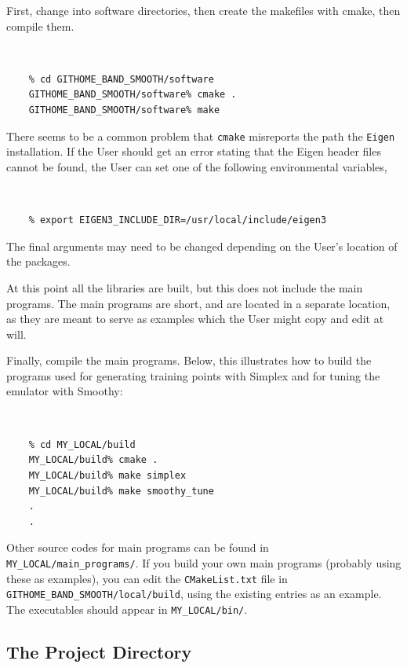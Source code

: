 \documentclass[UserManual.tex]{subfiles}
\begin{document}
First, change into software directories, then create the makefiles with cmake, then compile them.
{\tt 
\begin{verbatim}
    % cd GITHOME_BAND_SMOOTH/software
    GITHOME_BAND_SMOOTH/software% cmake .
    GITHOME_BAND_SMOOTH/software% make
\end{verbatim}
}
There seems to be a common problem that {\tt cmake} misreports the path the {\tt Eigen} installation. If the User should get an error stating that the Eigen header files cannot be found, the User can set one of the following environmental variables,
{\tt 
\begin{verbatim}
    % export EIGEN3_INCLUDE_DIR=/usr/local/include/eigen3
\end{verbatim}
}
The final arguments may need to be changed depending on the User's location of the packages.

At this point all the libraries are built, but this does not include the main programs. The main programs are short, and are located in a separate location, as they are meant to serve as examples which the User might copy and edit at will.

Finally, compile the main programs. Below, this illustrates how to build the programs used for generating training points with Simplex and for tuning the emulator with Smoothy:
{\tt
\begin{verbatim}
    % cd MY_LOCAL/build
    MY_LOCAL/build% cmake .
    MY_LOCAL/build% make simplex
    MY_LOCAL/build% make smoothy_tune
    .
    .
\end{verbatim}
}
Other source codes for main programs can be found in {\tt MY\_LOCAL/main\_programs/}. If you build your own main programs (probably using these as examples), you can edit the {\tt CMakeList.txt} file in {\tt GITHOME\_BAND\_SMOOTH/local/build}, using the existing entries as an example. The executables should appear in {\tt MY\_LOCAL/bin/}. 

\subsection{The Project Directory}
\end{document}
